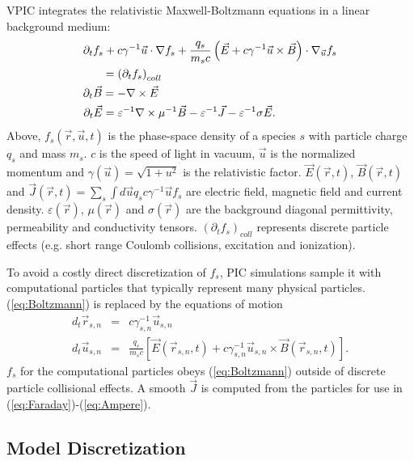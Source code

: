\documentclass[journal,twoside]{IEEEtran}
\newcommand{\eps}{\varepsilon}
\newcommand{\vecr}{\vec{r}}
\newcommand{\vecu}{\vec{u}}
\newcommand{\vecJ}{\vec{J}}
\newcommand{\vecE}{\vec{E}}
\newcommand{\vecB}{\vec{B}}
\newcommand{\Deriv}[2]{d_{#2}#1}
\newcommand{\PDeriv}[2]{\partial_{#2}#1}
\newcommand{\DotP}[2]{#1 \cdot #2}
\newcommand{\CrossP}[2]{#1 \times #2}
\newcommand{\Grad}[1]{\nabla #1}
\newcommand{\Curl}[1]{\nabla \times #1}
\newcommand{\Gradu}[1]{\nabla_{\vecu} #1}
\newcommand{\eq}[1]{(\ref{eq:#1})}
\begin{document}
VPIC integrates the relativistic Maxwell-Boltzmann equations in a
linear background medium:
\begin{eqnarray}
\PDeriv{f_s}{t} + 
\DotP{c\gamma^{-1}\vecu}{\Grad{f_s}} +
\DotP{\frac{q_s}{m_s c}\left(\vecE+\CrossP{c\gamma^{-1}\vecu}{\vecB}\right)}
{\Gradu{f_s}}\nonumber&\\
= \left(\PDeriv{f_s}{t}\right)_{coll}\label{eq:Boltzmann}
\hspace{2.14in}&\\
\PDeriv{\vecB}{t} = -\Curl{\vecE} \label{eq:Faraday}
\hspace{2.18in}&\\
\PDeriv{\vecE}{t} =
\eps^{-1}\Curl{\mu^{-1}\vecB} - \eps^{-1}\vecJ - \eps^{-1}\sigma\vecE.
\label{eq:Ampere}
\hspace{0.75in}&
\end{eqnarray}
Above, $f_s\left(\vecr,\vecu,t\right)$ is the phase-space density of a
species $s$ with particle charge $q_s$ and mass $m_s$.  $c$ is the
speed of light in vacuum, $\vecu$ is the normalized momentum and
$\gamma\left(\vecu\right) = \sqrt{1 + u^2}$ is the relativistic
factor.  $\vecE\left(\vecr,t\right)$, $\vecB\left(\vecr,t\right)$ and
$\vecJ\left(\vecr,t\right) = \sum_s \int d\vecu q_s c\gamma^{-1}\vecu
f_s$ are electric field, magnetic field and current density.
$\eps\left(\vecr\right)$, $\mu\left(\vecr\right)$ and
$\sigma\left(\vecr\right)$ are the background diagonal permittivity,
permeability and conductivity tensors.
$\left(\PDeriv{f_s}{t}\right)_{coll}$ represents discrete particle
effects (e.g. short range Coulomb collisions, excitation and
ionization).

To avoid a costly direct discretization of $f_s$, PIC simulations
sample it with computational particles that typically represent many
physical particles.  \eq{Boltzmann} is replaced by the equations of
motion
\begin{eqnarray}
\Deriv{\vecr_{s,n}}{t} &=& c \gamma_{s,n}^{-1} \vecu_{s,n} \label{eq:Position}\\
\Deriv{\vecu_{s,n}}{t} &=& \frac{q_s}{m_s c} \left[
\vecE\left(\vecr_{s,n},t\right) +
\CrossP{c\gamma_{s,n}^{-1}\vecu_{s,n}}{\vecB\left(\vecr_{s,n},t\right)}
\right] \label{eq:Momentum}
.
\end{eqnarray}
$f_s$ for the computational particles obeys \eq{Boltzmann} outside of
discrete particle collisional effects.  A smooth $\vecJ$ is computed
from the particles for use in \eq{Faraday}-\eq{Ampere}.

\subsection{Model Discretization}
\end{document}
